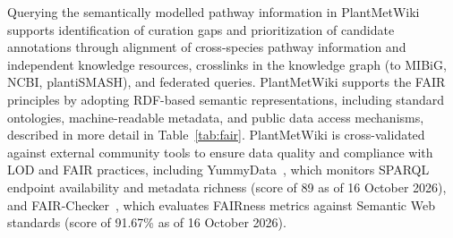 \documentclass[11pt,a4paper]{article}
\begin{document}
Querying the semantically modelled pathway information in PlantMetWiki supports identification of
curation gaps and prioritization of candidate annotations through alignment of cross-species pathway
information and independent knowledge resources, crosslinks in the knowledge graph (to MIBiG, NCBI,
plantiSMASH), and federated queries. PlantMetWiki supports the FAIR principles by adopting RDF-based
semantic representations, including standard ontologies, machine-readable metadata, and public data
access mechanisms, described in more detail in Table~\ref{tab:fair}. PlantMetWiki is cross-validated against external community tools to ensure data quality and compliance with LOD and FAIR practices, including YummyData~\cite{yamamoto2018}, which monitors SPARQL endpoint availability and metadata richness (score of 89 as of 16 October 2026), and FAIR-Checker~\cite{gaignard2023}, which evaluates FAIRness metrics against Semantic Web standards (score of 91.67\% as of 16 October 2026).
\end{document}
